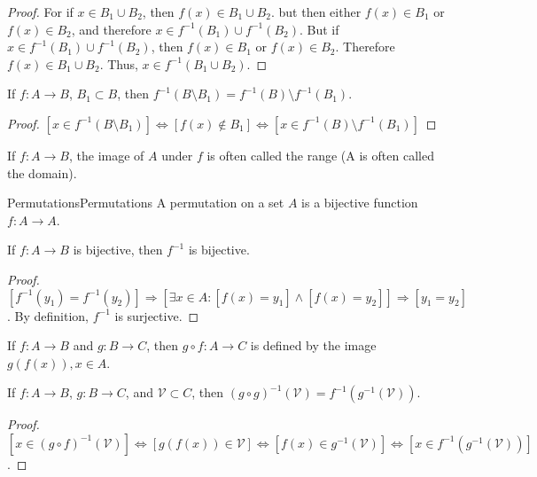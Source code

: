     \begin{proof}
        For if $x\in{B}_{1}\cup{B}_{2}$, then
        $f(x)\in{B}_{1}\cup{B}_{2}$. but then either
        $f(x)\in{B}_{1}$ or $f(x)\in{B}_{2}$, and therefore
        $x\in{f}^{\minus{1}}(B_1)\cup{f}^{\minus{1}}(B_2)$. But if
        $x\in{f}^{\minus{1}}(B_{1})\cup{f}^{\minus{1}}(B_2)$, then
        $f(x)\in{B}_{1}$ or $f(x)\in{B}_{2}$. Therefore
        $f(x)\in{B}_{1}\cup{B}_{2}$. Thus, $x\in{f}^{-1}(B_1\cup{B}_2)$.
    \end{proof}
    \begin{theorem}
    If $f:A\rightarrow B$, $B_1 \subset B$, then $f^{-1}(B\setminus B_1) = f^{-1}(B)\setminus f^{-1}(B_1)$.
    \end{theorem}
    \begin{proof}
    $[x\in f^{-1}(B\setminus B_1)]\Leftrightarrow [f(x)\notin B_1]\Leftrightarrow [x\in f^{-1}(B)\setminus f^{-1}(B_1)]$
    \end{proof}
    If $f:A\rightarrow B$, the image of $A$ under $f$
    is often called the range (A is often called the domain).
    \begin{ldefinition}{Permutations}{Permutations}
        A permutation on a set $A$ is a bijective function
        $f:A\rightarrow{A}$.
    \end{ldefinition}
    \begin{theorem}
    If $f:A\rightarrow B$ is bijective, then $f^{-1}$ is bijective.
    \end{theorem}
    \begin{proof}
    $[f^{-1}(y_1) = f^{-1}(y_2)]\Rightarrow [\exists x\in A:[f(x) = y_1]\land [f(x)=y_2]]\Rightarrow [y_1=y_2]$. By definition, $f^{-1}$ is surjective.
    \end{proof}
    \begin{definition}
    If $f:A\rightarrow B$ and $g:B\rightarrow C$, then $g\circ f:A\rightarrow C$ is defined by the image $g(f(x)), x\in A$. 
    \end{definition}
    \begin{theorem}
    If $f:A\rightarrow B$, $g:B\rightarrow C$, and $\mathcal{V}\subset C$, then $(g\circ g)^{-1}(\mathcal{V}) = f^{-1}(g^{-1}(\mathcal{V}))$.
    \end{theorem}
    \begin{proof}
    $[x\in (g\circ f)^{-1}(\mathcal{V})]\Leftrightarrow [g(f(x))\in \mathcal{V}] \Leftrightarrow [f(x)\in g^{-1}(\mathcal{V})]\Leftrightarrow [x\in f^{-1}(g^{-1}(\mathcal{V}))]$.
    \end{proof}
